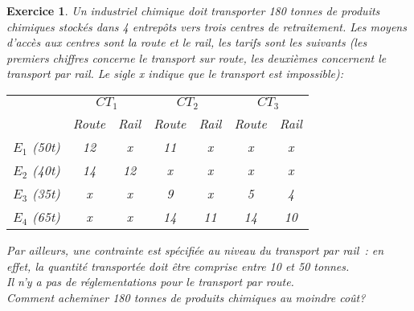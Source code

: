 \documentclass[french]{beamer}
\newtheorem{exercice}{Exercice}
\begin{document}
\begin{frame}
  \begin{exercice}
    {\footnotesize
    Un industriel  chimique doit  transporter 180  tonnes de  produits chimiques
    stockés  dans 4  entrepôts vers  trois centres  de retraitement.  Les moyens
    d’accès aux centres sont  la route et le rail, les  tarifs sont les suivants
    (les  premiers  chiffres concerne  le  transport  sur route,  les  deuxièmes
    concernent le  transport par rail. Le  sigle x indique que  le transport est
    impossible):

    {\tiny
    \begin{center}
      \begin{tabular}{|c|c|c|c|c|c|c|}
         \cline{2-7}
        \multicolumn{1}{c|}{}&
         \multicolumn{2}{c|}{$CT_1$}& \multicolumn{2}{c|}{$CT_2$}& \multicolumn{2}{c|}{$CT_3$}\\
        \cline{2-7}
                 \multicolumn{1}{c|}{}             &Route&Rail&Route&Rail&Route&Rail\\
        \hline
        $E_1$ (50t)&12&x&11&x&x&x \\
        \hline
        $E_2$ (40t)&14&12&x&x&x&x \\
        \hline
        $E_3$ (35t)&x&x&9&x&5&4 \\
        \hline
        $E_4$ (65t)&x&x&14&11&14&10 \\
        \hline
      \end{tabular}
    \end{center}
    }
    Par ailleurs, une contrainte est spécifiée au niveau du transport par rail :
    en  effet,  la quantité  transportée  doit  être  comprise  entre 10  et  50
    tonnes.\\
    Il n’y a pas de réglementations pour le transport par route.\\
    Comment
    acheminer 180 tonnes de produits chimiques au moindre coût?
    }
  \end{exercice}
\end{frame}
\end{document}
